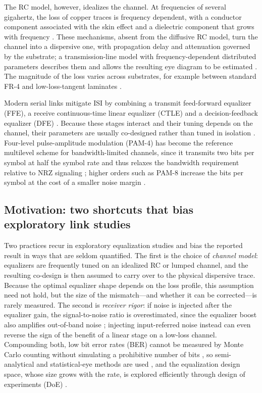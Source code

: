 \documentclass[twocolumn]{USG}
\begin{document}
The RC model, however, idealizes the channel. At frequencies of several
gigahertz, the loss of copper traces is frequency dependent, with a
conductor component associated with the skin effect and a dielectric
component that grows with frequency \cite{9888577,915226}. These mechanisms,
absent from the diffusive RC model, turn the channel into a dispersive one,
with propagation delay and attenuation governed by the substrate; a
transmission-line model with frequency-dependent distributed parameters
describes them and allows the resulting eye diagram to be estimated
\cite{8861405,7445206}. The magnitude of the loss varies across substrates,
for example between standard FR-4 and low-loss-tangent laminates
\cite{9785524,10385078}.

Modern serial links mitigate ISI by combining a transmit feed-forward
equalizer (FFE), a receive continuous-time linear equalizer (CTLE) and a
decision-feedback equalizer (DFE) \cite{10260232,10811094}. Because these
stages interact and their tuning depends on the channel, their parameters
are usually co-designed rather than tuned in isolation \cite{11169790}.
Four-level pulse-amplitude modulation (PAM-4) has become the reference
multilevel scheme for bandwidth-limited channels, since it transmits two
bits per symbol at half the symbol rate and thus relaxes the bandwidth
requirement relative to NRZ signaling \cite{7964959,7193371}; higher orders
such as PAM-8 increase the bits per symbol at the cost of a smaller noise
margin \cite{8963973}.

\subsection{Motivation: two shortcuts that bias exploratory link studies}
Two practices recur in exploratory equalization studies and bias the
reported result in ways that are seldom quantified. The first is the choice
of \emph{channel model}: equalizers are frequently tuned on an idealized RC
or lumped channel, and the resulting co-design is then assumed to carry over
to the physical dispersive trace. Because the optimal equalizer shape
depends on the loss profile, this assumption need not hold, but the size of
the mismatch---and whether it can be corrected---is rarely measured. The
second is \emph{receiver rigor}: if noise is injected after the equalizer
gain, the signal-to-noise ratio is overestimated, since the equalizer boost
also amplifies out-of-band noise \cite{9707817}; injecting input-referred
noise instead can even reverse the sign of the benefit of a linear stage on
a low-loss channel. Compounding both, low bit error rates (BER) cannot be
measured by Monte Carlo counting without simulating a prohibitive number of
bits \cite{6248821}, so semi-analytical and statistical-eye methods are used
\cite{7202856,10415105}, and the equalization design space, whose size grows
with the rate, is explored efficiently through design of experiments (DoE)
\cite{7851249}.
\end{document}
